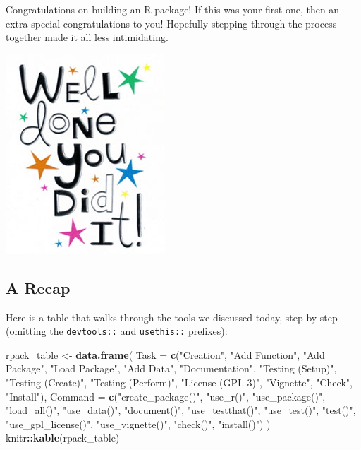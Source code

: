 \documentclass[
]{book}
\newenvironment{Shaded}{\begin{snugshade}}{\end{snugshade}}
\newcommand{\DataTypeTok}[1]{\textcolor[rgb]{0.13,0.29,0.53}{#1}}
\newcommand{\KeywordTok}[1]{\textcolor[rgb]{0.13,0.29,0.53}{\textbf{#1}}}
\newcommand{\NormalTok}[1]{#1}
\newcommand{\OperatorTok}[1]{\textcolor[rgb]{0.81,0.36,0.00}{\textbf{#1}}}
\newcommand{\StringTok}[1]{\textcolor[rgb]{0.31,0.60,0.02}{#1}}
\begin{document}
Congratulations on building an R package! If this was your first one, then an extra special congratulations to you! Hopefully stepping through the process together made it all less intimidating.

\begin{center}\includegraphics[width=0.5\linewidth]{images/well_done} \end{center}

\hypertarget{a-recap}{%
\subsection{A Recap}\label{a-recap}}

Here is a table that walks through the tools we discussed today, step-by-step (omitting the \texttt{devtools::} and \texttt{usethis::} prefixes):

\begin{Shaded}
\begin{Highlighting}[]
\NormalTok{rpack_table <-}\StringTok{ }\KeywordTok{data.frame}\NormalTok{(}
  \DataTypeTok{Task =} \KeywordTok{c}\NormalTok{(}\StringTok{"Creation"}\NormalTok{, }\StringTok{"Add Function"}\NormalTok{, }\StringTok{"Add Package"}\NormalTok{, }\StringTok{"Load Package"}\NormalTok{, }\StringTok{"Add Data"}\NormalTok{, }\StringTok{"Documentation"}\NormalTok{, }\StringTok{"Testing (Setup)"}\NormalTok{, }\StringTok{"Testing (Create)"}\NormalTok{, }\StringTok{"Testing (Perform)"}\NormalTok{, }\StringTok{"License (GPL-3)"}\NormalTok{, }\StringTok{"Vignette"}\NormalTok{, }\StringTok{"Check"}\NormalTok{, }\StringTok{"Install"}\NormalTok{),}
  \DataTypeTok{Command =} \KeywordTok{c}\NormalTok{(}\StringTok{"create_package()"}\NormalTok{, }\StringTok{"use_r()"}\NormalTok{, }\StringTok{"use_package()"}\NormalTok{, }\StringTok{"load_all()"}\NormalTok{, }\StringTok{"use_data()"}\NormalTok{, }\StringTok{"document()"}\NormalTok{, }\StringTok{"use_testthat()"}\NormalTok{, }\StringTok{"use_test()"}\NormalTok{, }\StringTok{"test()"}\NormalTok{, }\StringTok{"use_gpl_license()"}\NormalTok{, }\StringTok{"use_vignette()"}\NormalTok{, }\StringTok{"check()"}\NormalTok{, }\StringTok{"install()"}\NormalTok{)}
\NormalTok{)}
\NormalTok{knitr}\OperatorTok{::}\KeywordTok{kable}\NormalTok{(rpack_table)}
\end{Highlighting}
\end{Shaded}
\end{document}
